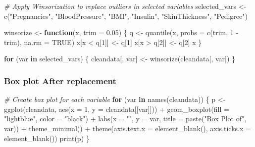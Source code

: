 \documentclass[
]{article}
\newenvironment{Shaded}{\begin{snugshade}}{\end{snugshade}}
\newcommand{\AttributeTok}[1]{\textcolor[rgb]{0.77,0.63,0.00}{#1}}
\newcommand{\CommentTok}[1]{\textcolor[rgb]{0.56,0.35,0.01}{\textit{#1}}}
\newcommand{\ConstantTok}[1]{\textcolor[rgb]{0.00,0.00,0.00}{#1}}
\newcommand{\ControlFlowTok}[1]{\textcolor[rgb]{0.13,0.29,0.53}{\textbf{#1}}}
\newcommand{\DecValTok}[1]{\textcolor[rgb]{0.00,0.00,0.81}{#1}}
\newcommand{\FloatTok}[1]{\textcolor[rgb]{0.00,0.00,0.81}{#1}}
\newcommand{\FunctionTok}[1]{\textcolor[rgb]{0.00,0.00,0.00}{#1}}
\newcommand{\NormalTok}[1]{#1}
\newcommand{\OtherTok}[1]{\textcolor[rgb]{0.56,0.35,0.01}{#1}}
\newcommand{\SpecialCharTok}[1]{\textcolor[rgb]{0.00,0.00,0.00}{#1}}
\newcommand{\StringTok}[1]{\textcolor[rgb]{0.31,0.60,0.02}{#1}}
\begin{document}
\begin{Shaded}
\begin{Highlighting}[]
\CommentTok{\# Apply Winsorization to replace outliers in selected variables}
\NormalTok{selected\_vars }\OtherTok{\textless{}{-}} \FunctionTok{c}\NormalTok{(}\StringTok{"Pregnancies"}\NormalTok{, }\StringTok{"BloodPressure"}\NormalTok{, }\StringTok{"BMI"}\NormalTok{, }\StringTok{"Insulin"}\NormalTok{, }\StringTok{"SkinThickness"}\NormalTok{, }\StringTok{"Pedigree"}\NormalTok{)}

\NormalTok{winsorize }\OtherTok{\textless{}{-}} \ControlFlowTok{function}\NormalTok{(x, }\AttributeTok{trim =} \FloatTok{0.05}\NormalTok{) \{}
\NormalTok{  q }\OtherTok{\textless{}{-}} \FunctionTok{quantile}\NormalTok{(x, }\AttributeTok{probs =} \FunctionTok{c}\NormalTok{(trim, }\DecValTok{1} \SpecialCharTok{{-}}\NormalTok{ trim), }\AttributeTok{na.rm =} \ConstantTok{TRUE}\NormalTok{)}
\NormalTok{  x[x }\SpecialCharTok{\textless{}}\NormalTok{ q[}\DecValTok{1}\NormalTok{]] }\OtherTok{\textless{}{-}}\NormalTok{ q[}\DecValTok{1}\NormalTok{]}
\NormalTok{  x[x }\SpecialCharTok{\textgreater{}}\NormalTok{ q[}\DecValTok{2}\NormalTok{]] }\OtherTok{\textless{}{-}}\NormalTok{ q[}\DecValTok{2}\NormalTok{]}
\NormalTok{  x}
\NormalTok{\}}

\ControlFlowTok{for}\NormalTok{ (var }\ControlFlowTok{in}\NormalTok{ selected\_vars) \{}
\NormalTok{  cleandata[, var] }\OtherTok{\textless{}{-}} \FunctionTok{winsorize}\NormalTok{(cleandata[, var])}
\NormalTok{\}}
\end{Highlighting}
\end{Shaded}

\hypertarget{box-plot-after-replacement}{%
\subsubsection{Box plot After
replacement}\label{box-plot-after-replacement}}

\begin{Shaded}
\begin{Highlighting}[]
\CommentTok{\# Create box plot for each variable}
\ControlFlowTok{for}\NormalTok{ (var }\ControlFlowTok{in} \FunctionTok{names}\NormalTok{(cleandata)) \{}
\NormalTok{  p }\OtherTok{\textless{}{-}} \FunctionTok{ggplot}\NormalTok{(cleandata, }\FunctionTok{aes}\NormalTok{(}\AttributeTok{x =} \DecValTok{1}\NormalTok{, }\AttributeTok{y =}\NormalTok{ cleandata[[var]])) }\SpecialCharTok{+}
    \FunctionTok{geom\_boxplot}\NormalTok{(}\AttributeTok{fill =} \StringTok{"lightblue"}\NormalTok{, }\AttributeTok{color =} \StringTok{"black"}\NormalTok{) }\SpecialCharTok{+}
    \FunctionTok{labs}\NormalTok{(}\AttributeTok{x =} \StringTok{""}\NormalTok{, }\AttributeTok{y =}\NormalTok{ var, }\AttributeTok{title =} \FunctionTok{paste}\NormalTok{(}\StringTok{"Box Plot of"}\NormalTok{, var)) }\SpecialCharTok{+}
    \FunctionTok{theme\_minimal}\NormalTok{() }\SpecialCharTok{+}
    \FunctionTok{theme}\NormalTok{(}\AttributeTok{axis.text.x =} \FunctionTok{element\_blank}\NormalTok{(), }\AttributeTok{axis.ticks.x =} \FunctionTok{element\_blank}\NormalTok{())}
  \FunctionTok{print}\NormalTok{(p)}
\NormalTok{\}}
\end{Highlighting}
\end{Shaded}
\end{document}
